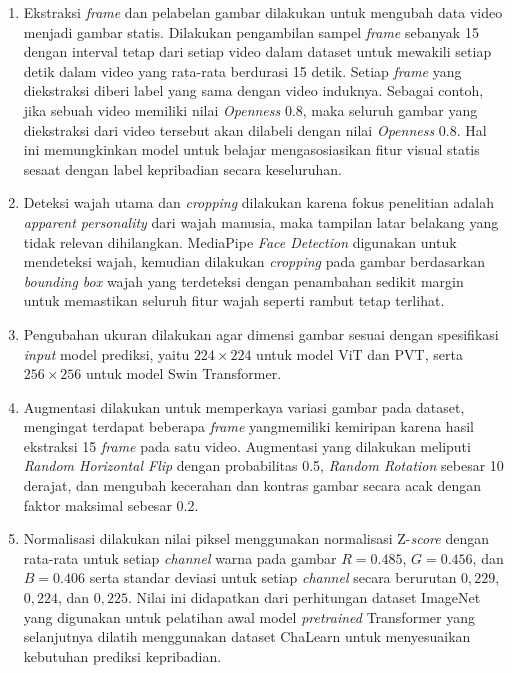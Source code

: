 \begin{enumerate}[nosep]
	\item Ekstraksi \textit{frame} dan pelabelan gambar dilakukan untuk mengubah data video menjadi gambar statis. Dilakukan pengambilan sampel \textit{frame} sebanyak 15 dengan interval tetap dari setiap video dalam dataset untuk mewakili setiap detik dalam video yang rata-rata berdurasi 15 detik. Setiap \textit{frame} yang diekstraksi diberi label yang sama dengan video induknya. Sebagai contoh, jika sebuah video memiliki nilai \textit{Openness} 0.8, maka seluruh gambar yang diekstraksi dari video tersebut akan dilabeli dengan nilai \textit{Openness} 0.8. Hal ini memungkinkan model untuk belajar mengasosiasikan fitur visual statis sesaat dengan label kepribadian secara keseluruhan.

	\item Deteksi wajah utama dan \textit{cropping} dilakukan karena fokus penelitian adalah \textit{apparent personality} dari wajah manusia, maka tampilan latar belakang yang tidak relevan dihilangkan. MediaPipe \textit{Face Detection} digunakan untuk mendeteksi wajah, kemudian dilakukan \textit{cropping} pada gambar berdasarkan \textit{bounding box} wajah yang terdeteksi dengan penambahan sedikit margin untuk memastikan seluruh fitur wajah seperti rambut tetap terlihat.

	\item Pengubahan ukuran dilakukan agar dimensi gambar sesuai dengan spesifikasi \textit{input} model prediksi, yaitu $224 \times 224$ untuk model ViT dan PVT, serta $256 \times 256$ untuk model Swin Transformer.
	
	\item Augmentasi dilakukan untuk memperkaya variasi gambar pada dataset, mengingat terdapat beberapa \textit{frame} yangmemiliki kemiripan karena hasil ekstraksi 15 \textit{frame} pada satu video. Augmentasi yang dilakukan meliputi \textit{Random Horizontal Flip} dengan probabilitas 0.5, \textit{Random Rotation} sebesar 10 derajat, dan mengubah kecerahan dan kontras gambar secara acak dengan faktor maksimal sebesar 0.2.
	
	\item Normalisasi dilakukan nilai piksel menggunakan normalisasi Z-\textit{score} dengan rata-rata untuk setiap \textit{channel} warna pada gambar $R=0.485$, $G=0.456$, dan $B=0.406$ serta standar deviasi untuk setiap \textit{channel} secara berurutan $0,229$, $0,224$, dan $0,225$. Nilai ini didapatkan dari perhitungan dataset ImageNet yang digunakan untuk pelatihan awal model \textit{pretrained} Transformer yang selanjutnya dilatih menggunakan dataset ChaLearn untuk menyesuaikan kebutuhan prediksi kepribadian.
\end{enumerate}

